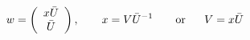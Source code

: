 \begin{equation}
w =
\left(
\begin{array}{c}
x \bar{U} \\
\bar{U}
\end{array}
\right),~~~~~~ x = V \bar{U}^{-1}~~~~~~{\rm or}~~~~~V = x \bar{U}   \label{1.39}
\end{equation}

